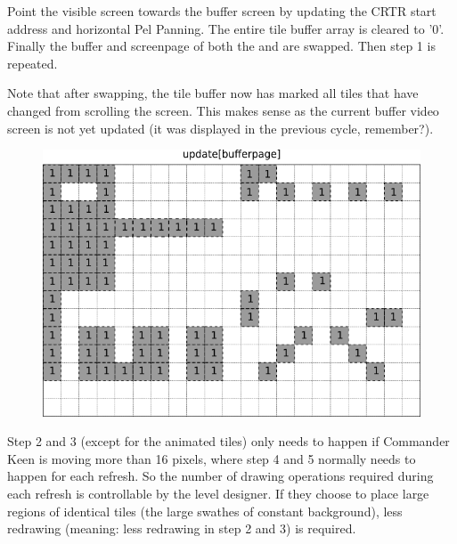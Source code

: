 \documentclass[book.tex]{subfiles}
\begin{document}
\begin{minipage}{.4\textwidth}
Point the visible screen towards the buffer screen by updating the CRTR start address and horizontal Pel Panning. The entire tile buffer array is cleared to '0'. Finally the buffer and screenpage of both the  and  are swapped. Then step 1 is repeated. \\
\par
Note that after swapping, the tile buffer now has marked all tiles that have changed from scrolling the screen. This makes sense as the current buffer video screen is not yet updated (it was displayed in the previous cycle, remember?). 
 \end{minipage}
\begin{minipage}{.6\textwidth}
\begin{figure}[H]
  \centering
 \includegraphics[width=.9\textwidth]{screenshots_300dpi/game/Scroll_KC1-3_1-scroll_final.png}
 \label{fig:kc1_3_update_final_img_1}  
\end{figure}
\end{minipage}


\pagebreak

Step 2 and 3 (except for the animated tiles) only needs to happen if Commander Keen is moving more than 16 pixels, where step 4 and 5 normally needs to happen for each refresh.
So the number of drawing operations required during each refresh is controllable by the level designer. If they choose to place large regions of identical tiles (the large swathes of constant background), less redrawing (meaning: less redrawing in step 2 and 3) is required.
\end{document}

